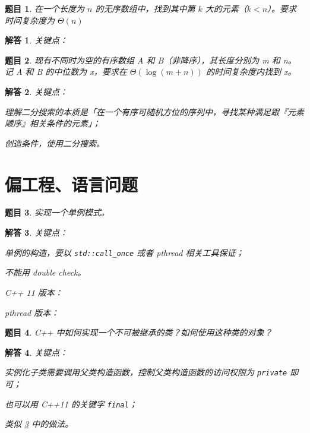 \documentclass[UTF8, final]{ctexart}
\newtheorem{question}{题目}
\newtheorem{solution}{解答}
\begin{document}
\begin{question}
在一个长度为 $n$ 的无序数组中，找到其中第 $k$ 大的元素（$k < n$）。要求时间复杂度为 $\Theta(n)$
\end{question}
\begin{solution}
关键点：
\end{solution}

\begin{question}
现有不同时为空的有序数组 A 和 B（非降序），其长度分别为 m 和 n。记 A 和 B 的中位数为 x，要求在 $\Theta(\log(m + n))$ 的时间复杂度内找到 x。
\end{question}
\begin{solution}
关键点：
\begin{compactitem}
\item 理解二分搜索的本质是「在一个有序可随机方位的序列中，寻找某种满足跟『元素顺序』相关条件的元素」；
\item 创造条件，使用二分搜索。
\end{compactitem}

\end{solution}

\section{偏工程、语言问题}
\begin{question}
\label{q:singleton}
实现一个单例模式。
\end{question}
\begin{solution}
关键点：
\begin{compactitem}
    \item 单例的构造，要以 \lstinline[style=lcpp]|std::call_once| 或者 \textsf{pthread} 相关工具保证；
    \item 不能用 double check。
\end{compactitem}
C++ 11 版本：


\textsf{pthread} 版本：

\end{solution}

\begin{question}
C++ 中如何实现一个不可被继承的类？如何使用这种类的对象？
\end{question}
\begin{solution}
关键点：
\begin{compactitem}
    \item 实例化子类需要调用父类构造函数，控制父类构造函数的访问权限为 \lstinline[style=lcpp]|private| 即可；
    \item 也可以用 C++11 的关键字 \lstinline[style=lcpp]|final|；
    \item 类似 \ref{q:singleton} 中的做法。
\end{compactitem}
\end{solution}
\end{document}
